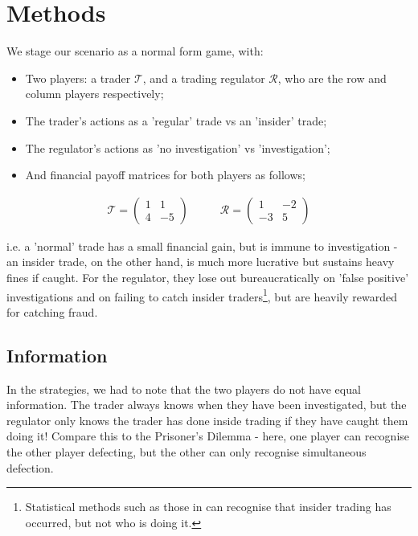 \documentclass{article}
\begin{document}
\section{Methods}

We stage our scenario as a normal form game, with:
\begin{itemize}
\item Two players: a trader $\mathcal{T}$, and a trading regulator $\mathcal{R}$, who are the row and column players respectively;
\item The trader's actions as a 'regular' trade vs an 'insider' trade;
\item The regulator's actions as 'no investigation' vs 'investigation';
\item And financial payoff matrices for both players as follows;
\end{itemize}
\begin{equation*}
\begin{split}
    \mathcal{T} = 
    \begin{pmatrix}
    1 & 1 \\
    4 & -5
    \end{pmatrix}
\end{split}
\quad\quad
\begin{split}
    \mathcal{R} = 
    \begin{pmatrix}
    1 & -2 \\
    -3 & 5
    \end{pmatrix}
\end{split}
\end{equation*}

i.e. a 'normal' trade has a small financial gain, but is immune to investigation - an insider trade, on the other hand, is much more lucrative but sustains heavy fines if caught. For the regulator, they lose out bureaucratically on 'false positive' investigations and on failing to catch insider traders\footnote{Statistical methods such as those in \citet{bris2005insider} can recognise that insider trading has occurred, but not who is doing it.}, but are heavily rewarded for catching fraud. 

\subsection{Information}
In the strategies, we had to note that the two players do not have equal information. The trader always knows when they have been investigated, but the regulator only knows the trader has done inside trading if they have caught them doing it! Compare this to the Prisoner's Dilemma - here, one player can recognise the other player defecting, but the other can only recognise simultaneous defection.



\end{document}
